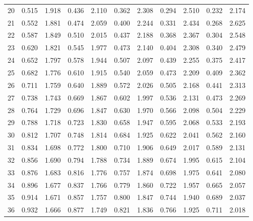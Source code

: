 \documentclass[12pt]{article}
\begin{document}
\begin{table}
\begin{center}
{\begin{tabular}{|c|c|c|c|c|c|c|c|c|c|c|}
20&0.515&1.918&0.436&2.110&0.362&2.308&0.294&
2.510&0.232&2.174\\


21&0.552&1.881&0.474&2.059&0.400&2.244&0.331&2.434&0.268&2.625\\


22&0.587&1.849&0.510&
2.015&0.437&2.188&0.368&2.367&0.304&2.548\\


23&0.620&1.821&0.545&1.977&0.473&
2.140&0.404&2.308&0.340&2.479\\



24& 0.652& 1.797& 0.578& 1.944 &0.507 &2.097 &0.439& 2.255 &0.375&
 2.417\\



25& 0.682& 1.776& 0.610& 1.915 &0.540 &2.059 &0.473 &2.209& 0.409&
 2.362\\


26& 0.711& 1.759 &0.640 &1.889& 0.572& 2.026& 0.505 &2.168& 0.441
 &2.313\\


27& 0.738& 1.743& 0.669 &1.867& 0.602 &1.997& 0.536& 2.131 &0.473
 &2.269\\



28& 0.764 &1.729 &0.696 &1.847& 0.630& 1.970 &0.566& 2.098& 0.504&
 2.229\\

29&0.788 &1.718&0.723& 1.830&0.658&1.947&0.595&2.068&0.533&2.193\\


30&0.812&
1.707&0.748&1.814&0.684&1.925&0.622&2.041&0.562&2.160\\


31&0.834&1.698&0.772&
1.800&0.710&1.906&0.649&2.017&0.589&2.131\\


32&0.856&1.690&0.794&1.788&0.734&
1.889&0.674&1.995&0.615&2.104\\


33&0.876&
1.683&0.816&1.776&0.757&1.874&0.698&1.975&0.641&2.080\\


34&0.896&1.677&0.837&
1.766&0.779&1.860&0.722&1.957&0.665&2.057\\


35&0.914&1.671&0.857&1.757&0.800&
1.847&0.744&1.940&0.689&2.037\\


36&0.932&1.666&0.877&1.749&0.821&1.836&0.766&
1.925&0.711&2.018\\



\end{tabular}}
\end{center}
\end{table}
\end{document}
